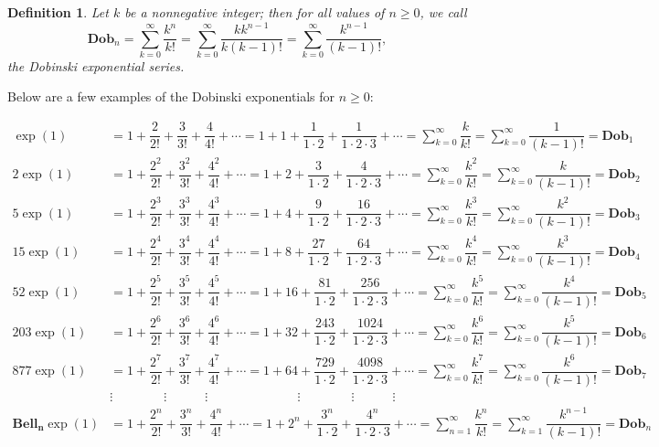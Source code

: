 \documentclass[pdflatex,sn-mathphys-num]{sn-jnl}%
\newcommand\scalemath[2]{\scalebox{#1}{\mbox{\ensuremath{\displaystyle #2}}}}
\newtheorem{definition}{Definition}
\theoremstyle{thmstyleone}%
\theoremstyle{thmstyletwo}%
\theoremstyle{thmstylethree}%
\begin{document}
\begin{definition}\label{Dobi}\cite{weisstein2002dobinski}
    Let $k$ be a nonnegative integer; then for all values of $n\geq 0$, we call 
    $$\mathbf{Dob}_n=\sum_{k=0}^{\infty}\dfrac{k^n}{k!}=\sum_{k=0}^{\infty}\dfrac{kk^{n-1}}{k(k-1)!}=\sum_{k=0}^{\infty}\dfrac{k^{n-1}}{(k-1)!},$$
    the Dobinski exponential series.
\end{definition}
Below are a few examples of the Dobinski exponentials for $n\geq0$:

\begin{align*}
    \exp(1)&= 1+\dfrac{2}{2!}+\dfrac{3}{3!}+\dfrac{4}{4!}+\cdots = 1+1+\dfrac{1}{1\cdotp 2}+\dfrac{1}{1\cdotp 2 \cdotp 3}+\cdots=\sum_{k=0}^{\infty}\dfrac{k}{k!}=\sum_{k=0}^{\infty}\dfrac{1}{(k-1)!}=\mathbf{Dob}_1\\ 
    2 \exp(1)&= 1+\dfrac{2^2}{2!}+\dfrac{3^2}{3!}+\dfrac{4^2}{4!}+\cdots = 1+2+\dfrac{3}{1\cdotp 2}+\dfrac{4}{1\cdotp 2 \cdotp 3}+\cdots=\sum_{k=0}^{\infty}\dfrac{k^2}{k!}=\sum_{k=0}^{\infty}\dfrac{k}{(k-1)!}=\mathbf{Dob}_2\\ 
    5 \exp(1)&= 1+\dfrac{2^3}{2!}+\dfrac{3^3}{3!}+\dfrac{4^3}{4!}+\cdots = 1+4+\dfrac{9}{1\cdotp 2}+\dfrac{16}{1\cdotp 2 \cdotp 3}+\cdots=\sum_{k=0}^{\infty}\dfrac{k^3}{k!}=\sum_{k=0}^{\infty}\dfrac{k^2}{(k-1)!}=\mathbf{Dob}_3\\ 
    15 \exp(1)&= 1+\dfrac{2^4}{2!}+\dfrac{3^4}{3!}+\dfrac{4^4}{4!}+\cdots = 1+8+\dfrac{27}{1\cdotp 2}+\dfrac{64}{1\cdotp 2 \cdotp 3}+\cdots=\sum_{k=0}^{\infty}\dfrac{k^4}{k!}=\sum_{k=0}^{\infty}\dfrac{k^3}{(k-1)!}=\mathbf{Dob}_4\\
    52 \exp(1)&= 1+\dfrac{2^5}{2!}+\dfrac{3^5}{3!}+\dfrac{4^5}{4!}+\cdots = 1+16+\dfrac{81}{1\cdotp 2}+\dfrac{256}{1\cdotp 2 \cdotp 3}+\cdots=\sum_{k=0}^{\infty}\dfrac{k^5}{k!}=\sum_{k=0}^{\infty}\dfrac{k^4}{(k-1)!}=\mathbf{Dob}_5\\ 
    203 \exp(1)&= 1+\dfrac{2^6}{2!}+\dfrac{3^6}{3!}+\dfrac{4^6}{4!}+\cdots = 1+32+\dfrac{243}{1\cdotp 2}+\dfrac{1024}{1\cdotp 2 \cdotp 3}+\cdots=\sum_{k=0}^{\infty}\dfrac{k^6}{k!}=\sum_{k=0}^{\infty}\dfrac{k^5}{(k-1)!}=\mathbf{Dob}_6\\
    877 \exp(1)&= 1+\dfrac{2^7}{2!}+\dfrac{3^7}{3!}+\dfrac{4^7}{4!}+\cdots = 1+64+\dfrac{729}{1\cdotp 2}+\dfrac{4098}{1\cdotp 2 \cdotp 3}+\cdots=\sum_{k=0}^{\infty}\dfrac{k^7}{k!}=\sum_{k=0}^{\infty}\dfrac{k^6}{(k-1)!}=\mathbf{Dob}_7 \\
      &\vdots \quad \quad \quad \quad \vdots \quad \quad \quad\vdots \quad \quad \quad \quad \quad \quad \quad\vdots \quad \quad \quad \quad \vdots \quad \quad \quad\vdots \quad \quad \quad \quad \quad \quad \quad\\
    \mathbf{Bell_{n}} \exp(1)&= 1+\dfrac{2^n}{2!}+\dfrac{3^n}{3!}+\dfrac{4^n}{4!}+\cdots = 1+2^n+\dfrac{3^n}{1\cdotp 2}+\dfrac{4^n}{1\cdotp 2 \cdotp 3}+\cdots=\sum_{n=1}^{\infty}\dfrac{k^n}{k!}=\sum_{k=1}^{\infty}\dfrac{k^{n-1}}{(k-1)!}=\mathbf{Dob}_{n}
\end{align*}
\end{document}
